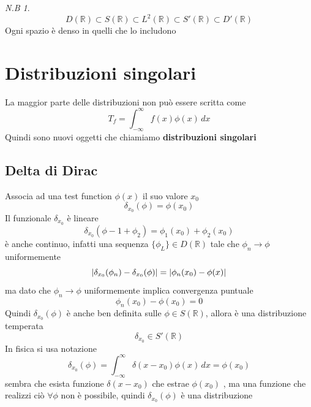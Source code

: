 \documentclass[a4paper,11pt]{report}
\theoremstyle{remark}
\newtheorem*{nb}{N.B}
\theoremstyle{definition}
\newcommand{\R}{\mathbb{R}}
\DeclarePairedDelimiter{\abs}{\lvert}{\rvert}
\begin{document}
\begin{nb}
	\[D(\R)\subset S(\R) \subset L^2(\R) \subset S'(\R) \subset D'(\R)\] 
	Ogni spazio è denso in quelli che lo includono
\end{nb}

\chapter{Distribuzioni singolari}

La maggior parte delle distribuzioni non può essere scritta come 
\begin{equation*}
	T_f= \int_{-\infty}^\infty f(x)\phi(x)\, dx 
\end{equation*}
Quindi sono nuovi oggetti che chiamiamo \textbf{distribuzioni singolari}

\section{Delta di Dirac}

Associa ad una test function $\phi(x)$ il suo valore $x_0$
\begin{equation*}
	\delta_{x_0}(\phi) = \phi(x_0)
\end{equation*}
Il funzionale $\delta_{x_0}$ è lineare 
\begin{equation*}
	\delta_{x_0}(\phi-1+\phi_2) = \phi_1(x_0) + \phi_2(x_0)
\end{equation*}
è anche continuo, infatti una sequenza $\{\phi_L\}\in D(\R)$ tale che $\phi_n \to \phi$ uniformemente
\begin{equation*}
	\abs{\delta_{x_0}(\phi_n)-\delta_{x_0}(\phi)} = \abs{\phi_n(x_0)-\phi(x)}
\end{equation*} 
ma dato che $\phi_n \to \phi$ uniformemente implica convergenza puntuale
\begin{equation*}
	\phi_n(x_0)-\phi(x_0) = 0
\end{equation*}
Quindi $\delta_{x_0}(\phi)$ è anche ben definita sulle $\phi\in S(\R)$, allora è una distribuzione temperata
\begin{equation*}
	\delta_{x_0}\in S'(\R)
\end{equation*}
In fisica si usa notazione 
\begin{equation*}
	\delta_{x_0}(\phi) = \int_{-\infty}^\infty \delta (x-x_0)\phi(x) \, dx = \phi(x_0)
\end{equation*}
sembra che esista funzione $\delta(x-x_0)$ che estrae $\phi(x_0)$ , ma una funzione che realizzi ciò $\forall \phi$ non è possibile, quindi $\delta_{x_0}(\phi)$ è una distribuzione 
\end{document}
